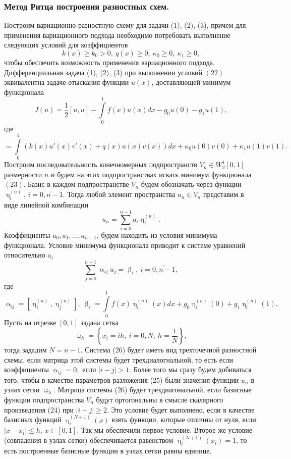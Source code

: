 \documentclass[a4paper, 12pt]{report}
\numberwithin{equation}{section}
\renewcommand{\leq}{\leqslant}
\renewcommand{\geq}{\geqslant}
\renewcommand{\alpha}{\upalpha}
\renewcommand{\beta}{\upbeta}
\renewcommand{\eta}{\upeta}
\renewcommand{\omega}{\upomega}
\begin{document}
	\subsubsection{Метод Ритца построения разностных схем.}
	Построим вариационно-разностную схему для задачи (1), (2), (3), причем для применения вариационного подхода необходимо потребовать выполнение следующих условий для коэффициентов 
	\begin{equation}
		k(x)\geq k_0 > 0,\ q(x)\geq 0,\ \kappa_0 \geq 0,\ 
	\kappa_1 \geq 0,
	\end{equation}
	чтобы обеспечить возможность применения вариационного подхода.
	Дифференциальная задача (1), (2), (3) при выполнении условий $(22)$ эквивалентна задаче отыскания функции $u(x)$, доставляющей минимум функционала
	\begin{equation}
		J(u) = \dfrac{1}{2}[u,u] - \int\limits_0^1 f(x)u(x)dx - g_0 u(0) - g_1 u(1),
	\end{equation}
	где \begin{equation}
		[u,v] = \int\limits_0^1 (k(x) u'(x)v'(x) + q(x)u(x)v(x))dx + \kappa _0 u(0)v(0) + \kappa_1 u(1)v(1).
	\end{equation}
	Построим последовательность конечномерных подпространств $V_n \in W_2^1[0,1]$ размерности $n$ и будем на этих подпространствах искать минимум функционала $(23)$.
	Базис в каждом подпространстве $V_n$ будем обозначать через функции $\eta_i^{(n)}$, $i=\overline{0,n-1}$. Тогда любой элемент пространства $u_n \in V_n$ представим в виде линейной комбинации
	\begin{equation}
		u_n = \sum_{i=0}^{n-1} a_i \eta_i^{(n)}.
	\end{equation}
	Коэффициенты $a_0, a_1,\ldots, a_{n-1}$, будем находить из условия минимума функционала. Условие минимума функционала приводит к системе уравнений относительно $a_i$
	\begin{equation}
		\sum_{j=0}^{n-1}\alpha_{ij} a_j = \beta_i,\ i = \overline{0, n-1},
	\end{equation}
	где
	\begin{equation}
		\alpha_{ij} = [\eta_{i}^{(n)}, \eta_j^{(n)}],\ \beta_i = \int\limits_0^1 f(x)\eta_i^{(n)}(x)dx + g_0 \eta_i^{(n)}(0) + g_1 \eta_i^{(n)}(1).
	\end{equation}
	Пусть на отрезке $[0,1]$ задана сетка $$\omega_h = \left\{x_i = ih,\ i = \overline{0,N},\ h = \dfrac 1N\right\},$$
	тогда зададим $N = n-1$. Система (26) будет иметь вид трехточечной разностной схемы, если матрица этой системы будет трехдиалогнальной, то есть если коэффициенты $\alpha_{ij} = 0,$ если $|i-j|>1$. Более того мы сразу будем добиваться того, чтобы в качестве параметров разложения (25) были значения функции $u_n$ в узлах сетки $\omega_h$. Матрица системы (26) будет трехдиагональной, если базисные функции подпространства $V_n$ будут ортогональны в смысле скалярного произведения (24) при $|i-j|\geq 2$. Это условие будет выполнено, если в качестве базисных функций $\eta_i^{(N+1)}(x)$ взять функции, которые отличны от нуля, если $|x-x_i| \leq h$, $x \in [0,1]$. Так мы обеспечили первое условие. Второе же условие (совпадения в узлах сетки) обеспечивается равенством $\eta_i^{(N+1)}(x_i) = 1$, то есть построенные базисные функции в узлах сетки равны единице.\\\\
\end{document}
